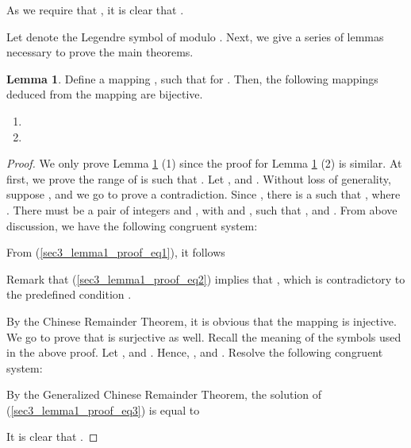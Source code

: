 \documentclass{mcom-l}
\theoremstyle{definition}
\newtheorem{sec3lemma1}{Lemma}[section]
\numberwithin{equation}{section}
\begin{document}
         As we require that , it is clear that .
         
         Let  denote the Legendre symbol of  modulo . Next, we give a series of lemmas necessary to prove the  main theorems.
            \begin{sec3lemma1}\label{lab_sec3_lemma1}
            Define a mapping , such that for . Then, the following mappings deduced from the mapping  are bijective.
            \begin{enumerate} \item
            
            \item
            
            \end{enumerate}
            \end{sec3lemma1}
            \begin{proof}
            We only prove Lemma \ref{lab_sec3_lemma1} (1) since the proof for Lemma \ref{lab_sec3_lemma1} (2) is similar. At first, we prove the range of  is such that . Let , and . Without loss of generality, suppose , and we go to prove a contradiction. Since , there is a  such that , where . There must be a pair of integers  and , with  and , such that , and . From above discussion, we have the following congruent system:
            
            From (\ref{sec3_lemma1_proof_eq1}), it follows 
            
            Remark that (\ref{sec3_lemma1_proof_eq2}) implies that , which is contradictory to the predefined condition .
            
            By the Chinese Remainder Theorem, it is obvious that the mapping  is injective. We go to prove that  is surjective as well. Recall the meaning of the symbols used in the above proof. Let , and . Hence, ,  and . Resolve the following congruent system:
            
            By the Generalized Chinese Remainder Theorem, the solution of (\ref{sec3_lemma1_proof_eq3}) is equal to
            
            It is clear that .
            \end{proof}
            
\end{document}
